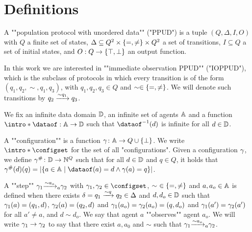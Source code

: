\section{Definitions}
\label{sec:definitions}


\begin{definition}
	A ""population protocol with unordered data"" ("PPUD") is a tuple $(Q, \Delta, I, O)$ with $Q$ a finite set of states,
	$\Delta \subseteq Q^2 \times \set{=, \neq} \times Q^2$ a set of transitions,
	$I \subseteq Q$ a set of initial states, and
	$O : Q \to \set{\top, \bot}$ an output function.
	
	In this work we are interested in ""immediate observation PPUD"" ("IOPPUD"), which is the subclass of protocols in which every transition is of the form $(q_1, q_2, \sim, q_1, q_3)$, with $q_1, q_2, q_3 \in Q$ and $\sim \in \set{=, \neq}$.
	We will denote such transitions by $q_2 \trans{q_1}{\sim} q_3$.
\end{definition}

We fix an infinite data domain $\Dataset$, an infinite set of agents $\Agentset$ and a function $\intro*\dataof : \Agentset \to \Dataset$ such that $\dataof^{-1}(d)$ is infinite for all $d \in \Dataset$.



A ""configuration"" is a function $\config \colon \Agentset \to Q \cup \set{\bot}$. We write $\intro*\configset$ for the set of all "configurations". Given a configuration $\config$, we define $\counting{\config} \colon \Dataset \to \nats^Q$ such that for all $d \in \Dataset$ and $q \in Q$, it holds that $\counting{\config}(d)(q) = \size{\set{a \in \Agentset \mid \dataof(a) = d \land \config(a) =q}}$.


A ""step"" $\config_1 \step{\sim}{a}{a_o} \config_2$ with $\config_1, \config_2 \in \configset$, $\sim~ \in \set{=, \neq}$ and $a, a_o \in \Agentset$ is defined when there exists  $\delta = q_1 \trans{q}{\sim} q_2 \in \Delta$ and $d, d_o \in \Dataset$ such that $\config_1(a) = (q_1, d)$, $\config_2(a) = (q_2, d)$ and $\config_1(a_o) = \config_2(a_o) = (q, d_o)$ and $\config_1(a') = \config_2(a')$ for all $a' \neq a$, and $d \sim d_o$.
We say that agent $a$ ""observes"" agent $a_o$.
We will write $\config_1 \to \config_2$ to say that there exist $a, a_0$ and $\sim$ such that $\config_1 \step{\sim}{a}{a_o} \config_2$.

